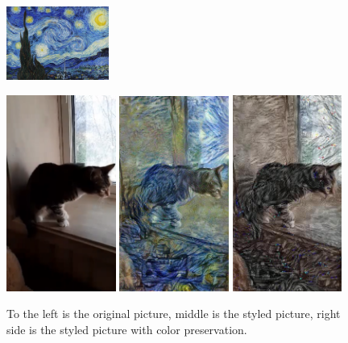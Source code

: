 \begin{figure}[!ht]
\begin{center}
\includegraphics[width=0.3\textwidth]{report/Method/images/style_starry_night.jpg}
\label{fig:starry night}\newline

\includegraphics[width=0.32\textwidth]{report/Method/images/original_cat.png}
\label{original cat}
\includegraphics[width=0.32\textwidth]{report/Method/images/styled_cat.png}
\label{styled cat}
\includegraphics[width=0.32\textwidth]{report/Method/images/color_preserved.png}
\label{color preserved cat}
\caption{To the left is the original picture, middle is the styled picture, right side is the styled picture with color preservation.}
\end{center}
\end{figure}
\newpage



